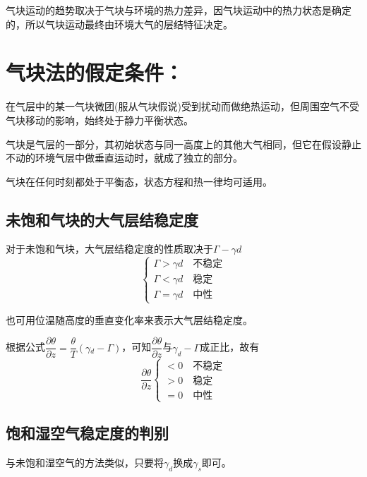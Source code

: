 \documentclass[UTF8,a4paper,11pt,oneside]{ctexbook}
\begin{document}
气块运动的趋势取决于气块与环境的热力差异，因气块运动中的热力状态是确定的，所以气块运动最终由环境大气的层结特征决定。

\section{气块法的假定条件：}

在气层中的某一气块微团(服从气块假说)受到扰动而做绝热运动，但周围空气不受气块移动的影响，始终处于静力平衡状态。

气块是气层的一部分，其初始状态与同一高度上的其他大气相同，但它在假设静止不动的环境气层中做垂直运动时，就成了独立的部分。

气块在任何时刻都处于平衡态，状态方程和热一律均可适用。

\subsection{未饱和气块的大气层结稳定度}

对于未饱和气块，大气层结稳定度的性质取决于\(\Gamma-\gamma{}d\)
\begin{equation}
\begin{cases}
    \Gamma>\gamma{}d\quad\text{不稳定}\\
    \Gamma<\gamma{}d\quad\text{稳定}\\
    \Gamma=\gamma{}d\quad\text{中性}
\end{cases}
\end{equation}

也可用位温随高度的垂直变化率来表示大气层结稳定度。

根据公式\(\dfrac{\partial{}\theta}{\partial{}z}=\dfrac{\theta}{T}(\gamma{}_d-\Gamma)\)，可知\(\dfrac{\partial{}\theta}{\partial{}z}\)与\(\gamma_d-\Gamma\)成正比，故有
\begin{equation}
\dfrac{\partial{}\theta}{\partial{}z}\begin{cases}
    <0\quad\text{不稳定}\\
    >0\quad\text{稳定}\\
    =0\quad\text{中性}
\end{cases}
\end{equation}

\subsection{饱和湿空气稳定度的判别}

与未饱和湿空气的方法类似，只要将\(\gamma_d\)换成\(\gamma_s\)即可。
\end{document}
